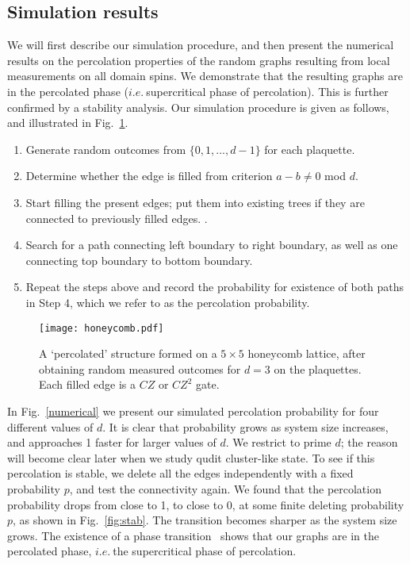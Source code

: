\documentclass[aps,amsfonts,pra,twocolumn,showpacs]{revtex4-1}
\newcommand{\thatis}{$i.e.~$}
\begin{document}
	
	\subsection{Simulation results} \label{sec:simulation}
	
	We will first describe our simulation procedure, and then present the numerical results on the percolation properties of the random graphs resulting from local measurements on all domain spins. We demonstrate that the resulting graphs are in the percolated phase (\thatis supercritical phase of percolation). This is further confirmed by a stability analysis. Our simulation procedure is given as follows, and illustrated in Fig.~\ref{simulation}.
	\begin{enumerate}
		\item Generate random outcomes from $\{0, 1, ... , d-1\}$ for each plaquette.
		\item Determine whether the edge is filled from criterion $a-b\neq0$ mod $d$.
		\item Start filling the present edges; put them into existing trees if they are connected to previously filled edges. \cite{Newman2001}.
		\item Search for a path connecting left boundary  to right boundary, as well as one connecting top boundary to bottom boundary.
		\item Repeat the steps above and record the probability for existence of both paths in Step 4, which we refer to as the percolation probability.
	\end{enumerate}
	
	\begin{figure}[h]
		\centering
		\texttt{[image: honeycomb.pdf]}
		\caption{A `percolated' structure formed on a $5\times5$ honeycomb lattice, after obtaining random measured outcomes for $d=3$ on the plaquettes. Each filled edge is a $CZ$ or $CZ^2$ gate.}
		\label{simulation}
	\end{figure}
	
	In Fig.~\ref{numerical} we present our simulated percolation probability for four different values of $d$. It is clear that probability grows as system size increases, and approaches 1 faster for larger values of $d$. We restrict to prime $d$; the reason will become clear later when we study qudit cluster-like state. To see if this percolation is stable, we delete all the edges independently with a fixed probability $p$, and test the connectivity again. We found that the percolation probability drops from close to 1, to close to 0, at some finite deleting probability $p$, as shown in Fig.~\ref{fig:stab}. The transition becomes sharper as the system size grows. The existence of a phase transition~\cite{Browne2008} shows that our graphs are in the percolated phase, \thatis the supercritical phase of percolation.
	
\end{document}
